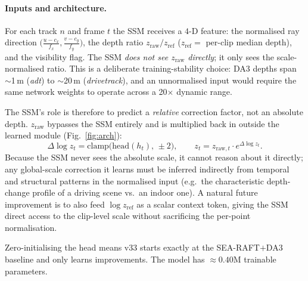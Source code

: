 \documentclass[11pt,a4paper]{article}
\begin{document}
\paragraph{Inputs and architecture.} For each track $n$ and frame $t$ the SSM receives a $4$-D
feature: the normalised ray direction $\big(\tfrac{u-c_x}{f_x},\tfrac{v-c_y}{f_y}\big)$,
the depth ratio $z_{\text{raw}}/z_{\text{ref}}$ ($z_{\text{ref}}=$ per-clip median depth), and
the visibility flag.  The SSM \emph{does not see $z_{\text{raw}}$ directly}; it only sees the
scale-normalised ratio.  This is a deliberate training-stability choice: DA3 depths span
$\sim$1\,m (\emph{adt}) to $\sim$20\,m (\emph{drivetrack}), and an unnormalised input would
require the same network weights to operate across a 20$\times$ dynamic range.

The SSM's role is therefore to predict a \emph{relative} correction factor, not an absolute
depth.  $z_{\text{raw}}$ bypasses the SSM entirely and is multiplied back in outside the learned
module (Fig.~\ref{fig:arch}):
\begin{equation}
\Delta\log z_t = \mathrm{clamp}\big(\mathrm{head}(h_t),\,\pm 2\big),\qquad
z_t = z_{\text{raw},t}\cdot e^{\Delta\log z_t}.
\label{eq:correction}
\end{equation}
Because the SSM never sees the absolute scale, it cannot reason about it directly; any
global-scale correction it learns must be inferred indirectly from temporal and structural
patterns in the normalised input (e.g.\ the characteristic depth-change profile of a driving
scene vs.\ an indoor one).  A natural future improvement is to also feed $\log z_{\text{ref}}$
as a scalar context token, giving the SSM direct access to the clip-level scale without
sacrificing the per-point normalisation.

Zero-initialising the head means v33 starts exactly at the SEA-RAFT$+$DA3 baseline and only
learns improvements.  The model has $\approx0.40$M trainable parameters.
\end{document}
